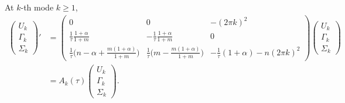 \documentclass[a4paper,11pt]{article}
\theoremstyle{remark}
\begin{document}
At $k$-th mode $k\ge1$,
\begin{align*}
  \begin{pmatrix}
   U_k \\ \Gamma_k \\ \Sigma_k
  \end{pmatrix}' &= 
  \begin{pmatrix}
   0 & 0 & -(2\pi k)^2\\
   \frac{1}{\tau}\frac{1+\alpha}{1+m} & -\frac{1}{\tau}\frac{1+\alpha}{1+m} & 0\\
   \frac{1}{\tau}\Big( n-\alpha + \frac{m(1+\alpha)}{1+m}\Big) &
   \frac{1}{\tau}\Big(m - \frac{m(1+\alpha)}{1+m}\Big) &
   -\frac{1}{\tau}(1+\alpha) -n(2\pi k)^2
  \end{pmatrix}
  \begin{pmatrix}
   U_k \\ \Gamma_k \\ \Sigma_k
  \end{pmatrix}\\
  &=A_k(\tau)\begin{pmatrix}
   U_k \\ \Gamma_k \\ \Sigma_k
  \end{pmatrix}.
\end{align*}
\end{document}
